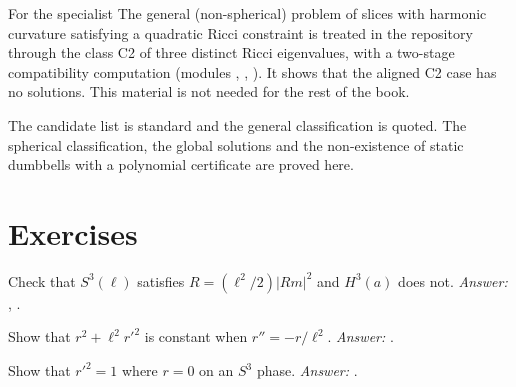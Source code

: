 \begin{asidebox}{For the specialist}
The general (non-spherical) problem of slices with harmonic curvature satisfying a quadratic Ricci constraint is treated in the repository through the class C2 of three distinct Ricci eigenvalues, with a two-stage compatibility computation (modules , , ). It shows that the aligned C2 case has no solutions. This material is not needed for the rest of the book.
\end{asidebox}

\begin{standsbox}
The candidate list is standard and the general classification is quoted. The spherical classification, the global solutions and the non-existence of static dumbbells with a polynomial certificate are proved here.
\end{standsbox}

\section*{Exercises}
\begin{exercise}Check that $S^3(\ell)$ satisfies $R=(\ell^2/2)|Rm|^2$ and $H^3(a)$ does not. \emph{Answer:} , .\end{exercise}
\begin{exercise}Show that $r^2+\ell^2r'^2$ is constant when $r''=-r/\ell^2$. \emph{Answer:} .\end{exercise}
\begin{exercise}Show that $r'^2=1$ where $r=0$ on an $S^3$ phase. \emph{Answer:} .\end{exercise}
